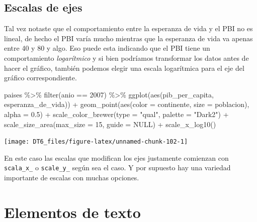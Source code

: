 \documentclass[
  openany]{book}
\newenvironment{Shaded}{\begin{snugshade}}{\end{snugshade}}
\newcommand{\AttributeTok}[1]{\textcolor[rgb]{0.77,0.63,0.00}{#1}}
\newcommand{\ConstantTok}[1]{\textcolor[rgb]{0.00,0.00,0.00}{#1}}
\newcommand{\DecValTok}[1]{\textcolor[rgb]{0.00,0.00,0.81}{#1}}
\newcommand{\FloatTok}[1]{\textcolor[rgb]{0.00,0.00,0.81}{#1}}
\newcommand{\FunctionTok}[1]{\textcolor[rgb]{0.00,0.00,0.00}{#1}}
\newcommand{\NormalTok}[1]{#1}
\newcommand{\SpecialCharTok}[1]{\textcolor[rgb]{0.00,0.00,0.00}{#1}}
\newcommand{\StringTok}[1]{\textcolor[rgb]{0.31,0.60,0.02}{#1}}
\begin{document}
\hypertarget{escalas-de-ejes}{%
\subsection{Escalas de ejes}\label{escalas-de-ejes}}

Tal vez notaste que el comportamiento entre la esperanza de vida y el PBI no es lineal, de hecho el PBI varía mucho mientras que la esperanza de vida va apenas entre 40 y 80 y algo.
Eso puede esta indicando que el PBI tiene un comportamiento \emph{logarítmico} y si bien podríamos transformar los datos antes de hacer el gráfico, también podemos elegir una escala logarítmica para el eje del gráfico correspondiente.

\begin{Shaded}
\begin{Highlighting}[]
\NormalTok{paises }\SpecialCharTok{\%\textgreater{}\%} 
  \FunctionTok{filter}\NormalTok{(anio }\SpecialCharTok{==} \DecValTok{2007}\NormalTok{) }\SpecialCharTok{\%\textgreater{}\%} 
  \FunctionTok{ggplot}\NormalTok{(}\FunctionTok{aes}\NormalTok{(pib\_per\_capita, esperanza\_de\_vida)) }\SpecialCharTok{+}
  \FunctionTok{geom\_point}\NormalTok{(}\FunctionTok{aes}\NormalTok{(}\AttributeTok{color =}\NormalTok{ continente, }\AttributeTok{size =}\NormalTok{ poblacion), }\AttributeTok{alpha =} \FloatTok{0.5}\NormalTok{) }\SpecialCharTok{+}
  \FunctionTok{scale\_color\_brewer}\NormalTok{(}\AttributeTok{type =} \StringTok{"qual"}\NormalTok{, }\AttributeTok{palette =} \StringTok{"Dark2"}\NormalTok{) }\SpecialCharTok{+}
  \FunctionTok{scale\_size\_area}\NormalTok{(}\AttributeTok{max\_size =} \DecValTok{15}\NormalTok{, }\AttributeTok{guide =} \ConstantTok{NULL}\NormalTok{) }\SpecialCharTok{+}
  \FunctionTok{scale\_x\_log10}\NormalTok{()}
\end{Highlighting}
\end{Shaded}

\begin{center}\texttt{[image: DT6\_files/figure-latex/unnamed-chunk-102-1]} \end{center}

En este caso las escalas que modifican los ejes justamente comienzan con \texttt{scala\_x\_} o \texttt{scale\_y\_} según sea el caso.
Y por supuesto hay una variedad importante de escalas con muchas opciones.

\hypertarget{elementos-de-texto}{%
\section{Elementos de texto}\label{elementos-de-texto}}
\end{document}
